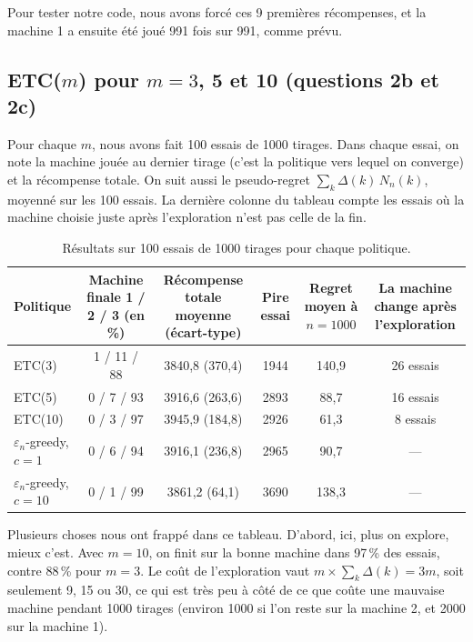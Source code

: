 \documentclass[11pt,a4paper]{article}
\begin{document}
Pour tester notre code, nous avons forcé ces 9 premières récompenses, et la machine 1 a ensuite été joué 991 fois sur 991, comme prévu.

\subsection{ETC($m$) pour $m = 3$, 5 et 10 (questions 2b et 2c)}

Pour chaque $m$, nous avons fait 100 essais de 1000 tirages. Dans chaque essai, on note la machine jouée au dernier tirage (c'est \og la politique vers lequel on converge\fg{}) et la récompense totale. On suit aussi le pseudo-regret $\sum_k \Delta(k)\, N_n(k)$, moyenné sur les 100 essais. La dernière colonne du tableau compte les essais où la machine choisie juste après l'exploration n'est pas celle de la fin.

\begin{table}[H]
  \centering\small
  \begin{tabularx}{\textwidth}{l C C c C C}
    \toprule
    Politique & Machine finale 1 / 2 / 3 (en \%) & Récompense totale moyenne (écart-type) & Pire essai & Regret moyen à $n = 1000$ & La machine change après l'exploration \\
    \midrule
    ETC(3)  & 1 / 11 / 88 & 3840,8 (370,4) & 1944 & 140,9 & 26 essais \\
    ETC(5)  & 0 / 7 / 93  & 3916,6 (263,6) & 2893 & 88,7  & 16 essais \\
    ETC(10) & 0 / 3 / 97  & 3945,9 (184,8) & 2926 & 61,3  & 8 essais \\
    $\varepsilon_n$-greedy, $c = 1$  & 0 / 6 / 94 & 3916,1 (236,8) & 2965 & 90,7  & --- \\
    $\varepsilon_n$-greedy, $c = 10$ & 0 / 1 / 99 & 3861,2 (64,1)  & 3690 & 138,3 & --- \\
    \bottomrule
  \end{tabularx}
  \caption{Résultats sur 100 essais de 1000 tirages pour chaque politique.}
  \label{tab:bandits}
\end{table}

Plusieurs choses nous ont frappé dans ce tableau. D'abord, ici, plus on explore, mieux c'est. Avec $m = 10$, on finit sur la bonne machine dans 97\,\% des essais, contre 88\,\% pour $m = 3$. Le coût de l'exploration vaut $m \times \sum_k \Delta(k) = 3m$, soit seulement 9, 15 ou 30, ce qui est très peu à côté de ce que coûte une mauvaise machine pendant 1000 tirages (environ 1000 si l'on reste sur la machine 2, et 2000 sur la machine 1).
\end{document}
